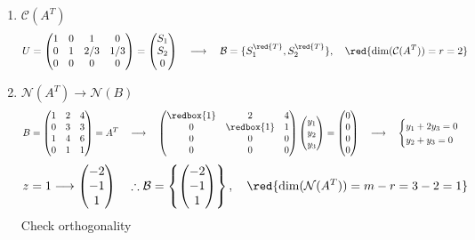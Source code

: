 \begin{enumerate}[label=$\arabic*^\circ$]
    \item $\mathcal{C}(A^T)$
    \[
        U = \begin{pmatrix}
            1 & 0 & 1 & 0 \\
            0 & 1 & 2/3 & 1/3 \\
            0 & 0 & 0 & 0
        \end{pmatrix} = \begin{pmatrix}
            S_1 \\ S_2 \\ 0
        \end{pmatrix} \quad \longrightarrow \quad \mathcal{B} = \{S_1^{\red{T}}, S_2^{\red{T}}\}, \quad \red{\dim(\mathcal{C}(A^T)) = r = 2}
    \]
    \item $\mathcal{N}(A^T) \longrightarrow \mathcal{N}(B)$
    \[
        B = \begin{pmatrix}
            1 & 2 & 4 \\
            0 & 3 & 3 \\
            1 & 4 & 6 \\
            0 & 1 & 1
        \end{pmatrix} = A^T \quad \longrightarrow \quad \begin{pmatrix}
            \redbox{1} & 2 & 4 \\
            0 & \redbox{1} & 1 \\
            0 & 0 & 0 \\
            0 & 0 & 0
        \end{pmatrix} \begin{pmatrix}
            y_1 \\ y_2 \\ y_3
        \end{pmatrix} = \begin{pmatrix}
            0 \\ 0 \\ 0 \\ 0
        \end{pmatrix} \quad \longrightarrow \quad
        \begin{cases}
            y_1 + 2y_3 = 0 \\
            y_2 + y_3 = 0
        \end{cases}
    \]
    \[
        z = 1 \longrightarrow \begin{pmatrix}
            -2 \\ -1 \\ 1
        \end{pmatrix} \quad \therefore \mathcal{B} = \left\{
            \begin{pmatrix}
                -2 \\ -1 \\ 1
            \end{pmatrix}
        \right\}, \quad \red{\dim(\mathcal{N}(A^T)) = m - r = 3 - 2 = 1}
    \]
    Check orthogonality
\end{enumerate}

